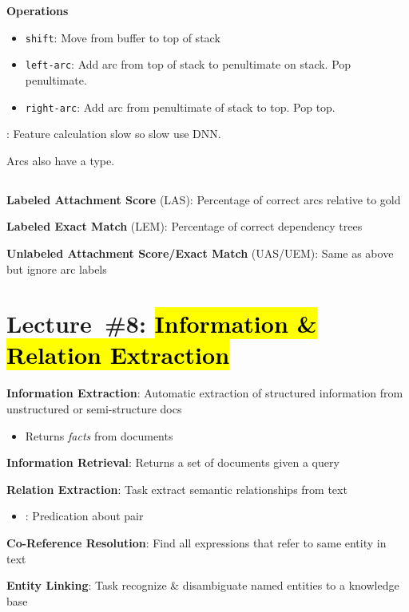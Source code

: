 \documentclass[9pt]{extarticle}
\renewcommand{\green}[1]{{\color{ForestGreen} #1}}
\newcommand{\greenbf}[1]{\textbf{\green{#1}}}
\newcommand{\redbf}[1]{\textbf{\red{#1}}}
\begin{document}
\begin{multicols}{3}
  \textbf{Operations}
  \begin{itemize}
    \item \texttt{shift}: Move from buffer to top of stack
    \item \texttt{left-arc}: Add arc from top of stack to penultimate on stack. Pop penultimate.
    \item \texttt{right-arc}: Add arc from penultimate of stack to top. Pop top.
  \end{itemize}

  \redbf{Problem}: Feature calculation slow so slow use DNN.

  Arcs also have a type.

  \subsection*{}

  \greenbf{Labeled Attachment Score} (LAS): Percentage of correct arcs relative to gold

  \greenbf{Labeled Exact Match} (LEM): Percentage of correct dependency trees

  \greenbf{Unlabeled Attachment Score/Exact Match} (UAS/UEM): Same as above but ignore arc labels

  \section*{Lecture~\#8: \hl{Information \& Relation Extraction}}

  \greenbf{Information Extraction}: Automatic extraction of structured information from unstructured or semi-structure docs
  \begin{itemize}
    \item Returns \textit{facts} from documents
  \end{itemize}

  \greenbf{Information Retrieval}: Returns a set of documents given a query

  \greenbf{Relation Extraction}: Task extract semantic relationships from text
  \begin{itemize}
    \item \redbf{Relation}: Predication about pair
  \end{itemize}

  \greenbf{Co-Reference Resolution}: Find all expressions that refer to same entity in text

  \greenbf{Entity Linking}: Task recognize \& disambiguate named entities to a knowledge base


\end{multicols}
\end{document}
